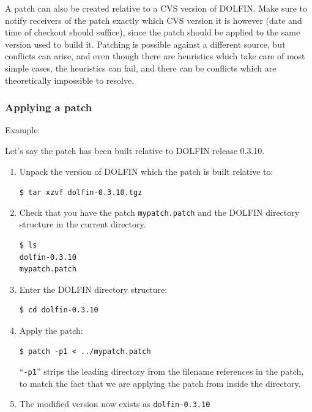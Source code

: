 \documentclass[12pt]{article}
\begin{document}
A patch can also be created relative to a CVS version of DOLFIN. Make
sure to notify receivers of the patch exactly which CVS version it is
however (date and time of checkout should suffice), since the patch
should be applied to the same version used to build it. Patching is
possible against a different source, but conflicts can arise, and even
though there are heuristics which take care of most simple cases, the
heuristics can fail, and there can be conflicts which are
theoretically impossible to resolve.

\subsubsection{Applying a patch}

Example:

Let's say the patch has been built relative to DOLFIN release 0.3.10.

\begin{enumerate}
\item{

Unpack the version of DOLFIN which the patch is built relative to:

\texttt{\$ tar xzvf dolfin-0.3.10.tgz}
}

\item{

Check that you have the patch \texttt{mypatch.patch} and the DOLFIN
directory structure in the current directory.

\begin{verbatim}
$ ls
dolfin-0.3.10
mypatch.patch
\end{verbatim}
}

\item{

Enter the DOLFIN directory structure:

\begin{verbatim}
$ cd dolfin-0.3.10
\end{verbatim}
}

\item{

Apply the patch:

\begin{verbatim}
$ patch -p1 < ../mypatch.patch
\end{verbatim}
}

``\texttt{-p1}'' strips the leading directory from the filename
references in the patch, to match the fact that we are applying the
patch from inside the directory.

\item{

The modified version now exists as \texttt{dolfin-0.3.10}

}

\end{enumerate}
\end{document}
